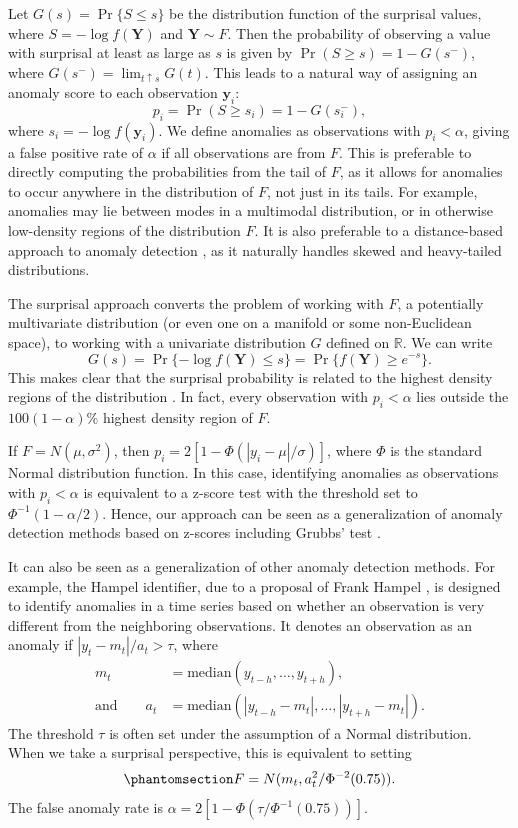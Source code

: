\documentclass[
  12pt]{article}
\theoremstyle{plain}
\theoremstyle{plain}
\theoremstyle{definition}
\theoremstyle{plain}
\theoremstyle{remark}
\begin{document}
Let \(G(s) = \Pr\{S\le s\}\) be the distribution function of the
surprisal values, where \(S = -\log f(\bm{Y})\) and \(\bm{Y}\sim F\).
Then the probability of observing a value with surprisal at least as
large as \(s\) is given by \(\Pr(S\ge s) = 1-G(s^-)\), where
\(G(s^-) = \lim_{t\uparrow s} G(t)\). This leads to a natural way of
assigning an anomaly score to each observation \(\bm{y}_i\): \[
p_i = \Pr(S \ge s_i)  = 1-G(s_i^-),
\] where \(s_i = -\log f(\bm{y}_i)\). We define anomalies as
observations with \(p_i < \alpha\), giving a false positive rate of
\(\alpha\) if all observations are from \(F\). This is preferable to
directly computing the probabilities from the tail of \(F\), as it
allows for anomalies to occur anywhere in the distribution of \(F\), not
just in its tails. For example, anomalies may lie between modes in a
multimodal distribution, or in otherwise low-density regions of the
distribution \(F\). It is also preferable to a distance-based approach
to anomaly detection \citep[e.g.,][]{hdoutliers}, as it naturally
handles skewed and heavy-tailed distributions.

The surprisal approach converts the problem of working with \(F\), a
potentially multivariate distribution (or even one on a manifold or some
non-Euclidean space), to working with a univariate distribution \(G\)
defined on \(\mathbb{R}\). We can write \[
G(s) = \Pr\{-\log f(\bm{Y})\le s\} = \Pr\{ f(\bm{Y})\ge e^{-s}\}.
\] This makes clear that the surprisal probability is related to the
highest density regions of the distribution \citep{HDR96}. In fact,
every observation with \(p_i< \alpha\) lies outside the
\(100(1-\alpha)\)\% highest density region of \(F\).

If \(F = N(\mu, \sigma^2)\), then \(p_i = 2[1-\Phi(|y_i-\mu|/\sigma)]\),
where \(\Phi\) is the standard Normal distribution function. In this
case, identifying anomalies as observations with \(p_i < \alpha\) is
equivalent to a z-score test with the threshold set to
\(\Phi^{-1}(1-\alpha/2)\). Hence, our approach can be seen as a
generalization of anomaly detection methods based on z-scores including
Grubbs' test \citep{Grubbs1950}.

It can also be seen as a generalization of other anomaly detection
methods. For example, the Hampel identifier, due to a proposal of Frank
Hampel \citep{Davies1993}, is designed to identify anomalies in a time
series based on whether an observation is very different from the
neighboring observations. It denotes an observation as an anomaly if
\(|y_t-m_t|/a_t > \tau\), where \begin{align*}
m_t &= \text{median}(y_{t-h}, \dots, y_{t+h}), \\
\text{and}\qquad
a_t &= \text{median}(|y_{t-h}-m_t|, \dots, |y_{t+h}- m_t|).
\end{align*} The threshold \(\tau\) is often set under the assumption of
a Normal distribution. When we take a surprisal perspective, this is
equivalent to setting
\begin{equation}\protect\phantomsection\label{eq-hampel}{
  F = N(m_t, a^2_t/\Phi^{-2}(0.75)).
}\end{equation} The false anomaly rate is
\(\alpha = 2[1 - \Phi(\tau/\Phi^{-1}(0.75))]\).
\end{document}
